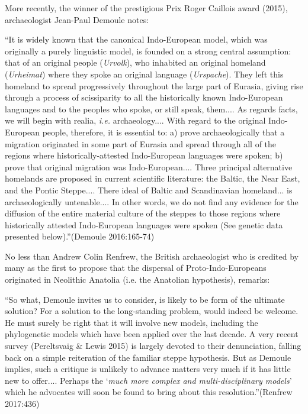 More recently, the winner of the prestigious Prix Roger Caillois award (2015), archaeologist Jean-Paul Demoule notes:

\begin{myquote}
“It is widely known that the canonical Indo-European model, which was originally a purely linguistic model, is founded on a strong central assumption: that of an original people (\textit{Urvolk}), who inhabited an original homeland (\textit{Urheimat}) where they spoke an original language (\textit{Urspache}). They left this homeland to spread progressively throughout the large part of Eurasia, giving rise through a process of scissiparity to all the historically known Indo-European languages and to the peoples who spoke, or still speak, them.... As regards facts, we will begin with realia, \textit{i.e.} archaeology.... With regard to the original Indo-European people, therefore, it is essential to: a) prove archaeologically that a migration originated in some part of Eurasia and spread through all of the regions where historically-attested Indo-European languages were spoken; b) prove that original migration was Indo-European.... Three principal alternative homelands are proposed in current scientific literature: the Baltic, the Near East, and the Pontic Steppe.... There ideal of Baltic and Scandinavian homeland... is archaeologically untenable.... In other words, we do not find any evidence for the diffusion of the entire material culture of the steppes to those regions where historically attested Indo-European languages were spoken (See genetic data presented below).”\hfill (Demoule 2016:165-74)
\end{myquote}

No less than Andrew Colin Renfrew, the British archaeologist who is credited by many as the first to propose that the dispersal of Proto-Indo-Europeans originated in Neolithic Anatolia (i.e. the Anatolian hypothesis), remarks:

\begin{myquote}
“So what, Demoule invites us to consider, is likely to be form of the ultimate solution? For a solution to the long-standing problem, would indeed be welcome. He must surely be right that it will involve new models, including the phylogenetic models which have been applied over the last decade. A very recent survey (Pereltsvaig \& Lewis 2015) is largely devoted to their denunciation, falling back on a simple reiteration of the familiar steppe hypothesis. But as Demoule implies, such a critique is unlikely to advance matters very much if it has little new to offer.... Perhaps the ‘\textit{much more complex and multi-disciplinary models}’ which he advocates will soon be found to bring about this resolution.”\hfill (Renfrew 2017:436)
\end{myquote}

